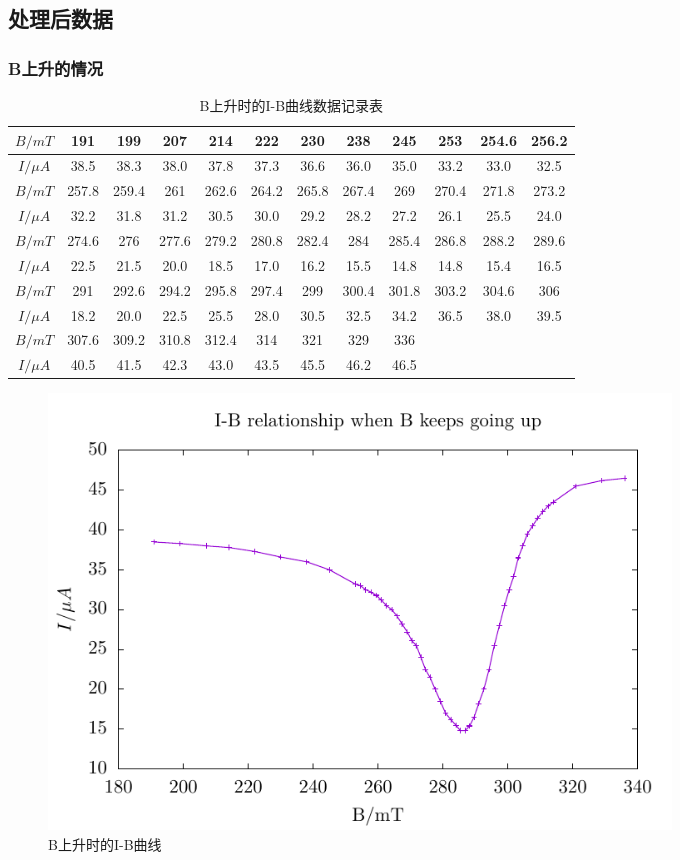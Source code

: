 \documentclass[a4paper,UTF8]{ctexart}
\begin{document}
\subsection{处理后数据}

\subsubsection{B上升的情况}

\begin{table}[H]
    \centering
    \begin{tabular}{|c|c|c|c|c|c|c|c|c|c|c|c|}
    \hline
        $B/mT$ & 191 & 199 & 207 & 214 & 222 & 230 & 238 & 245 & 253 & 254.6 & 256.2 \\ \hline
        $I/\mu A$ & 38.5 & 38.3 & 38.0 & 37.8 & 37.3 & 36.6 & 36.0 & 35.0 & 33.2 & 33.0 & 32.5 \\ \hline
        $B/mT$ & 257.8 & 259.4 & 261 & 262.6 & 264.2 & 265.8 & 267.4 & 269 & 270.4 & 271.8 & 273.2 \\ \hline
        $I/\mu A$ & 32.2 & 31.8 & 31.2 & 30.5 & 30.0 & 29.2 & 28.2 & 27.2 & 26.1 & 25.5 & 24.0 \\ \hline
        $B/mT$ & 274.6 & 276 & 277.6 & 279.2 & 280.8 & 282.4 & 284 & 285.4 & 286.8 & 288.2 & 289.6 \\ \hline
        $I/\mu A$ & 22.5 & 21.5 & 20.0 & 18.5 & 17.0 & 16.2 & 15.5 & 14.8 & 14.8 & 15.4 & 16.5 \\ \hline
        $B/mT$ & 291 & 292.6 & 294.2 & 295.8 & 297.4 & 299 & 300.4 & 301.8 & 303.2 & 304.6 & 306 \\ \hline
        $I/\mu A$ & 18.2 & 20.0 & 22.5 & 25.5 & 28.0 & 30.5 & 32.5 & 34.2 & 36.5 & 38.0 & 39.5 \\ \hline
        $B/mT$ & 307.6 & 309.2 & 310.8 & 312.4 & 314 & 321 & 329 & 336 &  & ~ & ~ \\ \hline
        $I/\mu A$ & 40.5 & 41.5 & 42.3 & 43.0 & 43.5 & 45.5 & 46.2 & 46.5 &  & ~ & ~ \\ \hline
    \end{tabular}
    \caption{B上升时的I-B曲线数据记录表}
\end{table}

\begin{figure}[H]
    \centering
    \begin{minipage}[b]{0.9\textwidth}
        \centering
        \includegraphics[width=0.8\textwidth]{./f1.pdf}
        \caption{B上升时的I-B曲线}
    \end{minipage}
\end{figure}
\end{document}
